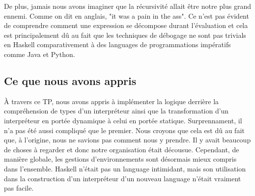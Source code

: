 \documentclass[a4paper,12pt]{article}
\begin{document}
        De plus, jamais nous avons imaginer que la récursivité allait être notre
        plus grand ennemi. Comme on dit en anglais, "it was a pain in the ass". Ce
        n'est pas évident de comprendre comment une expression se décompose durant
        l'évaluation et cela est principalement dû au fait que les techniques de 
        débogage ne sont pas trivials en Haskell comparativement à des languages
        de programmations impératifs comme Java et Python.
    \subsection{Ce que nous avons appris}
        À travers ce TP, nous avons appris à implémenter la logique derrière 
        la compréhension de types d'un interpréteur ainsi que la transformation
        d'un interpréteur en portée dynamique à celui en portée statique. 
        Surprennament, il n'a pas été aussi compliqué que le premier. Nous croyons
        que cela est dû au fait que, à l'origine, nous ne savions pas comment nous
        y prendre. Il y avait beaucoup de choses à regarder et donc notre 
        organisation était décousue. Cependant, de manière globale, les gestions 
        d'environnements sont désormais mieux compris dans l'ensemble. Haskell 
        n'était pas un language intimidant, mais son utilisation dans la construction
        d'un interpréteur d'un nouveau language n'était vraiment pas facile.
\end{document}
